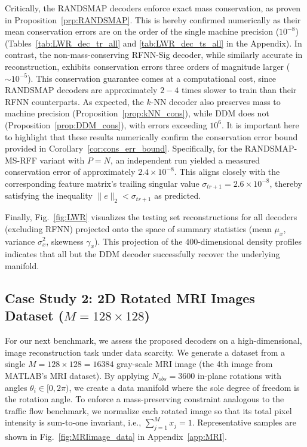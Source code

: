 \documentclass{article}
\begin{document}
Critically, the RANDSMAP decoders enforce exact mass conservation, as proven in Proposition~\ref{prp:RANDSMAP}. This is hereby confirmed numerically as their mean conservation errors are on the order of the single machine precision ($10^{-8}$) (Tables~\ref{tab:LWR_dec_tr_all} and \ref{tab:LWR_dec_ts_all} in the Appendix). In contrast, the non-mass-conserving RFNN-Sig decoder, while similarly accurate in reconstruction, exhibits conservation errors three orders of magnitude larger ($\sim 10^{-5}$). This conservation guarantee comes at a computational cost, since RANDSMAP decoders are approximately $2-4$ times slower to train than their RFNN counterparts. As expected, the $k$-NN decoder also preserves mass to machine precision (Proposition~\ref{prop:kNN_cons}), while DDM does not (Proposition~\ref{prop:DDM_cons}), with errors exceeding $10^6$. It is important here to highlight that these results numerically confirm the conservation error bound provided in Corollary~\ref{cor:cons_err_bound}. Specifically, for the RANDSMAP-MS-RFF variant with $P=N$, an independent run yielded a measured conservation error of approximately $2.4\times 10^{-8}$. This aligns closely with the corresponding feature matrix's trailing singular value $\sigma_{tr+1}=2.6\times 10^{-8}$, thereby satisfying the inequality $\|e\|_2<\sigma_{tr+1}$ as predicted.

Finally, Fig.~\ref{fig:LWR} visualizes the testing set reconstructions for all decoders (excluding RFNN) projected onto the space of summary statistics (mean $\mu_x$, variance $\sigma_x^2$, skewness $\gamma_x$). This projection of the $400$-dimensional density profiles indicates that all but the DDM decoder successfully recover the underlying manifold.
\subsection{Case Study 2: 2D Rotated MRI Images Dataset (\texorpdfstring{$M=128\times128$}{M=128 x 128})} \label{sb:MRI}
For our next benchmark, we assess the proposed decoders on a high-dimensional, image reconstruction task under data scarcity. We generate a dataset from a single $M=128\times128=16384$ gray-scale MRI image (the 4th image from MATLAB's MRI dataset). By applying $N_{obs}=3600$ in-plane rotations with angles $\theta_i\in[0, 2\pi)$, we create a data manifold where the sole degree of freedom is the rotation angle. To enforce a mass-preserving constraint analogous to the traffic flow benchmark, we normalize each rotated image so that its total pixel intensity is sum-to-one invariant, i.e., $\sum_{j=1}^Mx_j=1$. Representative samples are shown in Fig.~\ref{fig:MRIimage_data} in Appendix~\ref{app:MRI}.
\end{document}
